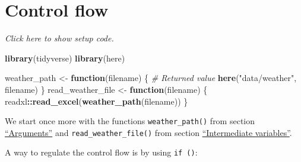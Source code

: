 \documentclass[]{book}
\newenvironment{Shaded}{\begin{snugshade}}{\end{snugshade}}
\newcommand{\CommentTok}[1]{\textcolor[rgb]{0.56,0.35,0.01}{\textit{#1}}}
\newcommand{\ControlFlowTok}[1]{\textcolor[rgb]{0.13,0.29,0.53}{\textbf{#1}}}
\newcommand{\KeywordTok}[1]{\textcolor[rgb]{0.13,0.29,0.53}{\textbf{#1}}}
\newcommand{\NormalTok}[1]{#1}
\newcommand{\OperatorTok}[1]{\textcolor[rgb]{0.81,0.36,0.00}{\textbf{#1}}}
\newcommand{\StringTok}[1]{\textcolor[rgb]{0.31,0.60,0.02}{#1}}
\begin{document}
\hypertarget{control-flow}{%
\section{Control flow}\label{control-flow}}

\emph{Click here to show setup code.}

\begin{Shaded}
\begin{Highlighting}[]
\KeywordTok{library}\NormalTok{(tidyverse)}
\KeywordTok{library}\NormalTok{(here)}

\NormalTok{weather_path <-}\StringTok{ }\ControlFlowTok{function}\NormalTok{(filename) \{}
  \CommentTok{# Returned value}
  \KeywordTok{here}\NormalTok{(}\StringTok{"data/weather"}\NormalTok{, filename)}
\NormalTok{\}}
\NormalTok{read_weather_file <-}\StringTok{ }\ControlFlowTok{function}\NormalTok{(filename) \{}
\NormalTok{  readxl}\OperatorTok{::}\KeywordTok{read_excel}\NormalTok{(}\KeywordTok{weather_path}\NormalTok{(filename))}
\NormalTok{\}}
\end{Highlighting}
\end{Shaded}

We start once more with the functions \texttt{weather\_path()} from section \protect\hyperlink{args}{``Arguments''} and \texttt{read\_weather\_file()} from section \protect\hyperlink{intermediate}{``Intermediate variables''}.

A way to regulate the control flow is by using \texttt{if\ ()}:
\end{document}
